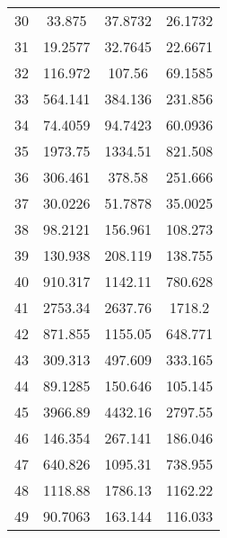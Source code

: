 \documentclass[a4paper,11pt,oneside,openany]{jsbook}
\begin{document}
\begin{table}[]
{\begin{tabular}{|c|c|c|c|}
30 & 33.875 & 37.8732 & 26.1732 \\
31 & 19.2577 & 32.7645 & 22.6671 \\
32 & 116.972 & 107.56 & 69.1585 \\
33 & 564.141 & 384.136 & 231.856 \\
34 & 74.4059 & 94.7423 & 60.0936 \\
35 & 1973.75 & 1334.51 & 821.508 \\
36 & 306.461 & 378.58 & 251.666 \\
37 & 30.0226 & 51.7878 & 35.0025 \\
38 & 98.2121 & 156.961 & 108.273 \\
39 & 130.938 & 208.119 & 138.755 \\
40 & 910.317 & 1142.11 & 780.628 \\
41 & 2753.34 & 2637.76 & 1718.2 \\
42 & 871.855 & 1155.05 & 648.771 \\
43 & 309.313 & 497.609 & 333.165 \\
44 & 89.1285 & 150.646 & 105.145 \\
45 & 3966.89 & 4432.16 & 2797.55 \\
46 & 146.354 & 267.141 & 186.046 \\
47 & 640.826 & 1095.31 & 738.955 \\
48 & 1118.88 & 1786.13 & 1162.22 \\
49 & 90.7063 & 163.144 & 116.033 \\ \hline
\end{tabular}
}
\end{table}
\end{document}
